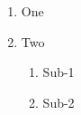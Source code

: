 \documentclass{article}
\begin{document}
\begin{enumerate}
	\item One
	\item Two
	\begin{enumerate}
		\item Sub-1
		\item Sub-2
	\end{enumerate}
\end{enumerate}
\end{document}
